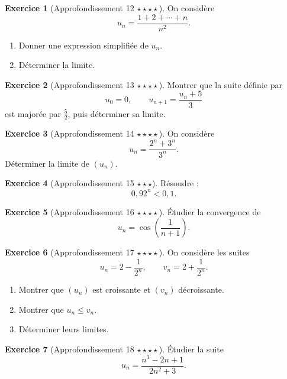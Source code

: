 \documentclass[11pt,a4paper]{article}
\theoremstyle{definition}
\newtheorem{exercice}{Exercice}[section]
\newcommand{\etoile}[1]{\hfill{\small\textbf{#1}}}
\begin{document}
\begin{exercice}[Approfondissement 12 \etoile{$\star\star\star\star$}]
On considère
\[
u_n=\frac{1+2+\cdots+n}{n^2}.
\]
\begin{enumerate}[label=\arabic*.]
    \item Donner une expression simplifiée de $u_n$.
    \item Déterminer la limite.
\end{enumerate}
\end{exercice}

\begin{exercice}[Approfondissement 13 \etoile{$\star\star\star\star$}]
Montrer que la suite définie par
\[
u_0=0,\qquad u_{n+1}=\frac{u_n+5}{3}
\]
est majorée par $\frac52$, puis déterminer sa limite.
\end{exercice}

\begin{exercice}[Approfondissement 14 \etoile{$\star\star\star\star$}]
On considère
\[
u_n=\frac{2^n+3^n}{3^n}.
\]
Déterminer la limite de $(u_n)$.
\end{exercice}

\begin{exercice}[Approfondissement 15 \etoile{$\star\star\star$}]
Résoudre :
\[
0{,}92^n<0{,}1.
\]
\end{exercice}

\begin{exercice}[Approfondissement 16 \etoile{$\star\star\star\star$}]
Étudier la convergence de
\[
u_n=\cos\left(\frac{1}{n+1}\right).
\]
\end{exercice}

\begin{exercice}[Approfondissement 17 \etoile{$\star\star\star\star$}]
On considère les suites
\[
u_n=2-\frac1{2^n},\qquad v_n=2+\frac1{2^n}.
\]
\begin{enumerate}[label=\arabic*.]
    \item Montrer que $(u_n)$ est croissante et $(v_n)$ décroissante.
    \item Montrer que $u_n\le v_n$.
    \item Déterminer leurs limites.
\end{enumerate}
\end{exercice}

\begin{exercice}[Approfondissement 18 \etoile{$\star\star\star\star$}]
Étudier la suite
\[
u_n=\frac{n^3-2n+1}{2n^2+3}.
\]
\end{exercice}
\end{document}
